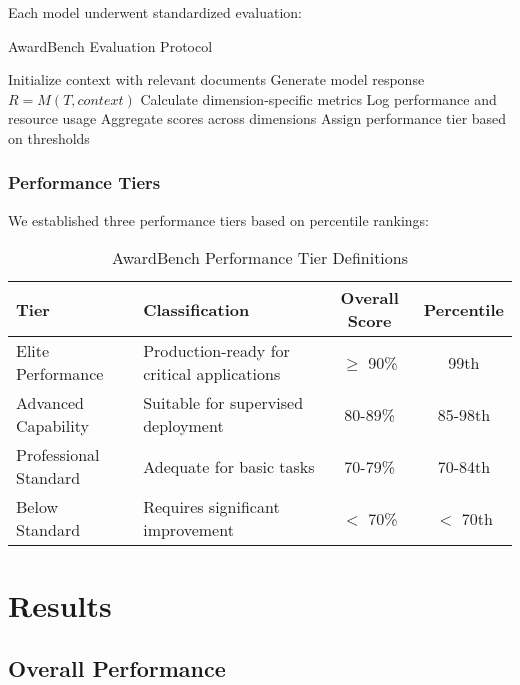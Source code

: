 \documentclass[11pt,a4paper]{article}
\begin{document}
Each model underwent standardized evaluation:

\begin{algorithm}[H]
\caption{AwardBench Evaluation Protocol}
\begin{algorithmic}[1]
        \STATE Initialize context with relevant documents
        \STATE Generate model response $R = M(T, context)$
        \STATE Calculate dimension-specific metrics
        \STATE Log performance and resource usage
    \ENDFOR
    \STATE Aggregate scores across dimensions
    \STATE Assign performance tier based on thresholds
\ENDFOR
\end{algorithmic}
\end{algorithm}

\subsubsection{Performance Tiers}

We established three performance tiers based on percentile rankings:

\begin{table}[H]
\centering
\caption{AwardBench Performance Tier Definitions}
\label{tab:tiers}
\begin{tabular}{@{}llcc@{}}
\toprule
\textbf{Tier} & \textbf{Classification} & \textbf{Overall Score} & \textbf{Percentile} \\
\midrule
Elite Performance & Production-ready for critical applications & $\geq$ 90\% & 99th \\
Advanced Capability & Suitable for supervised deployment & 80-89\% & 85-98th \\
Professional Standard & Adequate for basic tasks & 70-79\% & 70-84th \\
Below Standard & Requires significant improvement & $<$ 70\% & $<$ 70th \\
\bottomrule
\end{tabular}
\end{table}

\section{Results}

\subsection{Overall Performance}
\end{document}
